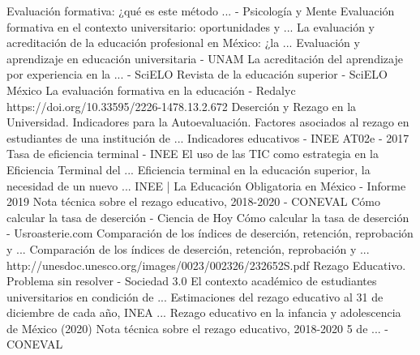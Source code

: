 \documentclass{article}
\begin{document}
\begin{thebibliography}{99}
     Evaluación formativa: ¿qué es este método ... - Psicología y Mente
     Evaluación formativa en el contexto universitario: oportunidades y ...
     La evaluación y acreditación de la educación profesional en México: ¿la ...
     Evaluación y aprendizaje en educación universitaria - UNAM
     La acreditación del aprendizaje por experiencia en la ... - SciELO
     Revista de la educación superior - SciELO México
     La evaluación formativa en la educación - Redalyc
     https://doi.org/10.33595/2226-1478.13.2.672
 Deserción y Rezago en la Universidad. Indicadores para la Autoevaluación.
     Factores asociados al rezago en estudiantes de una institución de ...
     Indicadores educativos - INEE
     AT02e - 2017 Tasa de eficiencia terminal - INEE
     El uso de las TIC como estrategia en la Eficiencia Terminal del ...
     Eficiencia terminal en la educación superior, la necesidad de un nuevo ...
     INEE | La Educación Obligatoria en México - Informe 2019
     Nota técnica sobre el rezago educativo, 2018-2020 - CONEVAL
     Cómo calcular la tasa de deserción - Ciencia de Hoy
     Cómo calcular la tasa de deserción - Usroasterie.com
     Comparación de los índices de deserción, retención, reprobación y ...
     Comparación de los índices de deserción, retención, reprobación y ...
     http://unesdoc.unesco.org/images/0023/002326/232652S.pdf
  Rezago Educativo. Problema sin resolver - Sociedad 3.0
     El contexto académico de estudiantes universitarios en condición de ...
     Estimaciones del rezago educativo al 31 de diciembre de cada año, INEA ...
     Rezago educativo en la infancia y adolescencia de México (2020)
     Nota técnica sobre el rezago educativo, 2018-2020 5 de ... - CONEVAL


\end{thebibliography}
\end{document}
